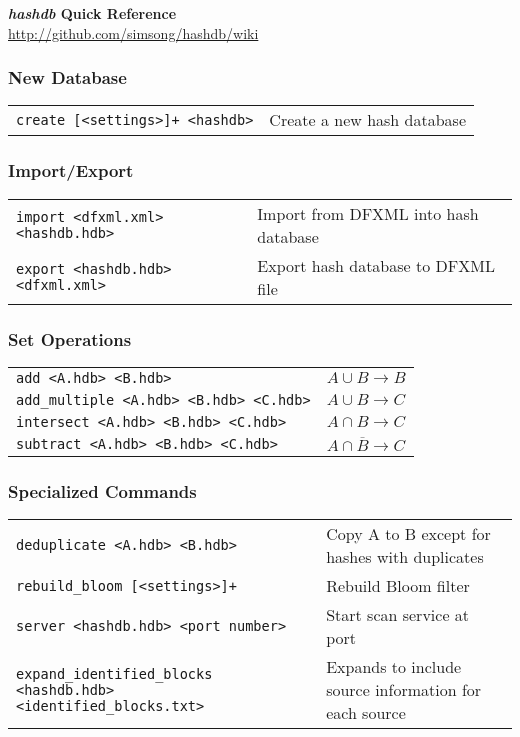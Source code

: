 \documentclass[12pt]{article}
\newcommand{\hdb}{\emph{hashdb}\xspace}
\begin{document}
\begin{center}
\textbf{\Large \hdb Quick Reference} \\
\url{http://github.com/simsong/hashdb/wiki}
\end{center}


\subsubsection*{New Database}
\begin{tabular}{p{8 cm} p{9 cm} }
\texttt{create [<settings>]+ <hashdb>} & Create a new hash database \\
\end{tabular}

\subsubsection*{Import/Export}
\begin{tabular}{p{8 cm} p{9 cm} }
\texttt{import <dfxml.xml> <hashdb.hdb>} & Import from DFXML into hash database \\
\texttt{export <hashdb.hdb> <dfxml.xml>} & Export hash database to DFXML file \\
\end{tabular}

\subsubsection*{Set Operations}
\begin{tabular}{p{8 cm} p{9 cm} }
\texttt{add <A.hdb> <B.hdb>} & $A \cup B \rightarrow B$ \\
\texttt{add\_multiple <A.hdb> <B.hdb> <C.hdb>} & $A \cup B \rightarrow C$ \\
\texttt{intersect <A.hdb> <B.hdb> <C.hdb>} & $A \cap B \rightarrow C$ \\
\texttt{subtract <A.hdb> <B.hdb> <C.hdb>} & $A \cap \overline B \rightarrow C$ \\
\end{tabular}

\subsubsection*{Specialized Commands}
\begin{tabular}{p{8 cm} p{9 cm} }
\texttt{deduplicate <A.hdb> <B.hdb>} & Copy A to B except for hashes with duplicates \\
\texttt{rebuild\_bloom [<settings>]+} & Rebuild Bloom filter \\
\texttt{server <hashdb.hdb> <port number>} & Start scan service at port \\
\texttt{expand\_identified\_blocks <hashdb.hdb> <identified\_blocks.txt>} & Expands to include source information for each source \\
\end{tabular}
\end{document}

